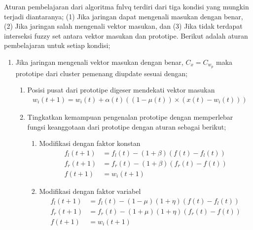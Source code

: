 Aturan pembelajaran dari algoritma \gls{fnlvq} terdiri dari tiga kondisi yang
mungkin terjadi diantaranya; (1) Jika jaringan dapat mengenali masukan dengan
benar, (2) Jika jaringan salah mengenali vektor masukan, dan (3) Jika tidak
terdapat interseksi fuzzy set antara vektor masukan dan prototipe. Berikut
adalah aturan pembelajaran untuk setiap kondisi;
\begin{enumerate}
  \setlength{\itemsep}{1pt}
  \setlength{\parskip}{0pt}
  \setlength{\parsep}{0pt}
  \item Jika jaringan mengenali vektor masukan dengan benar, $C_x = C_{w_p}$
  maka prototipe dari cluster pemenang diupdate sesuai dengan;
  \begin{enumerate}
  	\item Posisi pusat dari prototipe digeser mendekati vektor masukan
  	\begin{align}
  	w_i(t+1) = w_i(t) + \alpha(t) \left((1-\mu(t))\times(x(t) - w_i(t))  \right)
  	\end{align}
  	\item Tingkatkan kemampuan pengenalan prototipe  dengan memperlebar fungsi
  	keanggotaan dari prototipe dengan aturan sebagai berikut;
  	\begin{enumerate}
  	  \item Modifikasi dengan faktor konstan
  	  \begin{align}
  	  f_l(t+1) &= f_l(t) - (1+\beta) (f(t) - f_l(t))  \\
  	  f_r(t+1) &= f_r(t) - (1+\beta) (f_r(t) - f(t)) \nonumber \\
  	  f(t+1)   &= w_i(t+1) \nonumber
  	  \end{align}
  	  
  	  \item Modifikasi dengan faktor variabel
	  \begin{align}
  	  f_l(t+1) &= f_l(t) - (1 - \mu)(1+\eta)(f(t) - f_l(t))  \\
  	  f_r(t+1) &= f_r(t) - (1 + \mu)(1+\eta)(f_r(t) - f(t)) \nonumber \\
  	  f(t+1)   &= w_i(t+1) \nonumber
  	  \end{align}  	  
  	\end{enumerate}
  \end{enumerate}
  

\end{enumerate}
